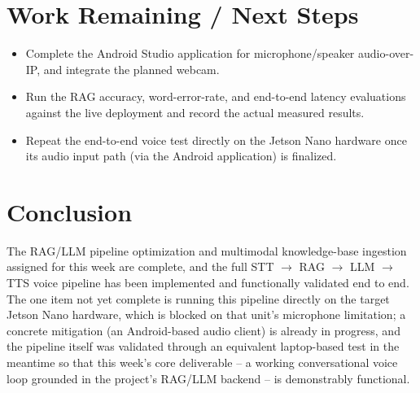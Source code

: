 \documentclass[11pt,a4paper]{article}
\begin{document}
\section{Work Remaining / Next Steps}

\begin{itemize}
    \item Complete the Android Studio application for microphone/speaker audio-over-IP, and integrate the planned webcam.
    \item Run the RAG accuracy, word-error-rate, and end-to-end latency evaluations against the live deployment and record the actual measured results.
    \item Repeat the end-to-end voice test directly on the Jetson Nano hardware once its audio input path (via the Android application) is finalized.
\end{itemize}

\section{Conclusion}

The RAG/LLM pipeline optimization and multimodal knowledge-base ingestion assigned for this week are complete, and the full STT $\rightarrow$ RAG $\rightarrow$ LLM $\rightarrow$ TTS voice pipeline has been implemented and functionally validated end to end. The one item not yet complete is running this pipeline directly on the target Jetson Nano hardware, which is blocked on that unit's microphone limitation; a concrete mitigation (an Android-based audio client) is already in progress, and the pipeline itself was validated through an equivalent laptop-based test in the meantime so that this week's core deliverable -- a working conversational voice loop grounded in the project's RAG/LLM backend -- is demonstrably functional.
\end{document}
